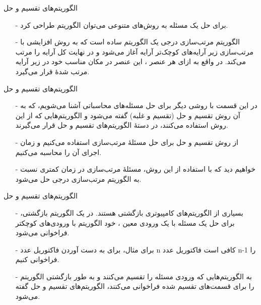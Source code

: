 \begin{frame}{‌الگوریتم‌های تقسیم و حل}
\begin{itemize}\itemr
\item[-]
برای حل یک مسئله به روش‌های متنوعی می‌توان الگوریتم طراحی کرد.
\item[-]
الگوریتم مرتب‌سازی درجی یک الگوریتم ساده است که به روش افزایشی با مرتب‌سازی زیر آرایه‌های کوچک‌تر آرایه آغاز می‌شود و در نهایت کل آرایه را مرتب می‌کند. در واقع به ازای هر عنصر
، این عنصر در مکان مناسب خود در زیر آرایه مرتب شدهٔ
قرار می‌گیرد.
\end{itemize}
\end{frame}


\begin{frame}{‌الگوریتم‌های تقسیم و حل}
\begin{itemize}\itemr
\item[-]
در این قسمت با روشی دیگر برای حل مسئله‌های محاسباتی آشنا می‌شویم، که به آن روش تقسیم و حل
(تقسیم و غلبه)
گفته می‌شود و الگوریتم‌هایی که از این روش استفاده می‌کنند، در دستهٔ الگوریتم‌های تقسیم و حل قرار می‌گیرند.
\item[-]
از روش تقسیم و حل برای حل مسئلهٔ مرتب‌سازی استفاده می‌کنیم و زمان اجرای آن را محاسبه می‌کنیم.
\item[-]
خواهیم دید که با استفاده از این روش، مسئلهٔ مرتب‌سازی در زمان کمتری نسبت به الگوریتم مرتب‌سازی درجی حل می‌شود.
\end{itemize}
\end{frame}


\begin{frame}{‌الگوریتم‌های تقسیم و حل}
\begin{itemize}\itemr
\item[-]
بسیاری از  الگوریتم‌های کامپیوتری بازگشتی
هستند. در یک الگوریتم بازگشتی، برای حل یک مسئله با یک ورودی معین ، خود الگوریتم با ورودی‌های کوچکتر فراخوانی می‌شود.
\item[-]
برای مثال، برای به دست آوردن فاکتوریل عدد n کافی است فاکتوریل عدد n-1 را فراخوانی کنیم.
\item[-]
به الگوریتم‌هایی که ورودی مسئله را تقسیم می‌کنند و به طور بازگشتی الگوریتم را برای قسمت‌های تقسیم شده فراخوانی می‌‌کنند، الگوریتم‌های تقسیم و حل گفته می‌شود.
\end{itemize}
\end{frame}



